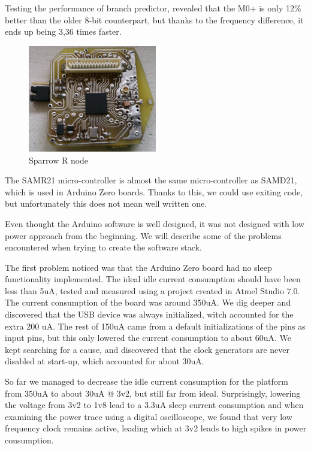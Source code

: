 Testing the performance of branch predictor, revealed that the M0+ is only 12\% better than
the older 8-bit counterpart, but thanks to the frequency difference, it ends up being 3,36 times
faster.


\begin{figure}[ht] \centering
\includegraphics[width=0.5\textwidth]{img/sparrowrf.jpg}
\caption{Sparrow R node}
\end{figure}

The SAMR21 micro-controller is almost the same micro-controller as SAMD21, which is used in Arduino
Zero boards. Thanks to this, we could use exiting code, but unfortunately this does not mean well
written one.

Even thought the Arduino software is well designed, it was not designed with low power approach
from the beginning. We will describe some of the problems encountered when trying to create the software stack.

The first problem noticed was that the Arduino Zero board had no sleep functionality implemented.
The ideal idle current consumption should have been less than 5uA, tested and measured using a
project created in Atmel Studio 7.0. The current consumption of the board was around 350uA. We dig
deeper and discovered that the USB device was always initialized, witch accounted for the extra 200
uA. The rest of 150uA came from a default initializations of the pins as input pins, but this only
lowered the current consumption to about 60uA. We kept searching for a cause, and discovered that
the clock generators are never disabled at start-up, which accounted for about 30uA.

So far we managed to decrease the idle current consumption for the platform from 350uA to about
30uA @ 3v2, but still far from ideal. Surprisingly, lowering the voltage from 3v2 to 1v8 lead to a 3.3uA
sleep current consumption and when examining the power trace using a digital oscilloscope, we found
that very low frequency clock remains active, leading which at 3v2 leads to high spikes in power consumption.

